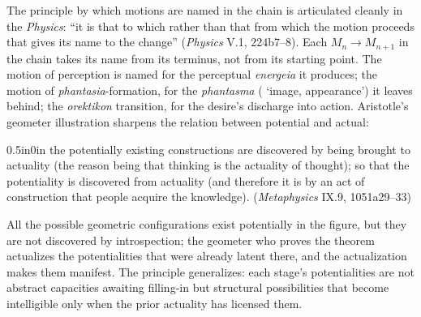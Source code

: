 The principle by which motions are named in the chain is articulated cleanly in the \textit{Physics}: ``it is that to which rather than that from which the motion proceeds that gives its name to the change'' (\textit{Physics} V.1, 224b7--8). Each $M_n \rightarrow M_{n+1}$ in the chain takes its name from its terminus, not from its starting point. The motion of perception is named for the perceptual \textit{energeia} it produces; the motion of \textit{phantasia}-formation, for the \textit{phantasma} ( `image, appearance') it leaves behind; the \textit{orektikon} transition, for the desire's discharge into action. Aristotle's geometer illustration sharpens the relation between potential and actual:
\begin{adjustwidth}{0.5in}{0in}
the potentially existing constructions are discovered by being brought to actuality (the reason being that thinking is the actuality of thought); so that the potentiality is discovered from actuality (and therefore it is by an act of construction that people acquire the knowledge). (\textit{Metaphysics} IX.9, 1051a29--33)
\end{adjustwidth}
All the possible geometric configurations exist potentially in the figure, but they are not discovered by introspection; the geometer who proves the theorem actualizes the potentialities that were already latent there, and the actualization makes them manifest. The principle generalizes: each stage's potentialities are not abstract capacities awaiting filling-in but structural possibilities that become intelligible only when the prior actuality has licensed them.

